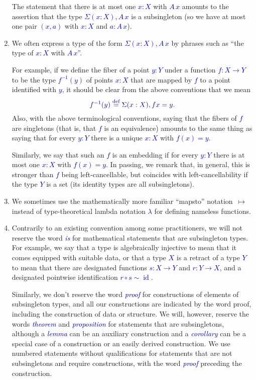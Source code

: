 \documentclass[10pt]{article}
\newcommand{\db}{\textcolor{darkblue}}
\newcommand{\df}[1]{\emph{\db{#1}}}
\newcommand{\m}[1]{\db{$#1$}}
\newcommand{\M}[1]{\[\db{#1}\]}
\newcommand{\id}{\operatorname{id}}
\newcommand{\comp}{\mathrel{\circ}}
\newcommand{\eqdef}{\overset{\text{def}}{=}}
\theoremstyle{definition}
\begin{document}
\begin{enumerate}
  The statement that there is at most one \m{x:X} with \m{A \, x}
  amounts to the assertion that the type \m{\Sigma (x:X), A \, x} is a
  subsingleton (so we have at most one pair \m{(x,a)} with \m{x:X} and
  \m{a : A\, x}).

\item We often express a type of the form \m{\Sigma(x:X), A \, x} by
  phrases such as ``the type of \m{x:X} with \m{A \, x}''.

  For example, if we define the fiber of a point \m{y:Y} under a
  function \m{f : X \to Y} to be the type \m{f^{-1}(y)} of points \m{x:X}
  that are mapped by \m{f} to a point identified with \m{y}, it
  should be clear from the above conventions that we mean
  \M{
   f^{-1}(y) \eqdef \Sigma (x : X), f x = y.
  }
 Also, with the above terminological conventions, saying that the
 fibers of \m{f} are singletons (that is, that \m{f} is an equivalence)
 amounts to the same thing as saying that for every \m{y:Y} there is a
 unique \m{x:X} with \m{f(x)=y}.

 Similarly, we say that such an \m{f} is an embedding if for every
 \m{y:Y} there is at most one \m{x:X} with \m{f(x)=y}. In passing, we
 remark that, in general, this is stronger than \m{f} being
 left-cancellable, but coincides with left-cancellability if the type
 \m{Y} is a set (its identity types are all subsingletons).

\item We sometimes use the mathematically more familiar ``mapsto''
  notation~\m{\mapsto} instead of type-theoretical lambda notation
  \m{\lambda} for defining nameless functions.

\item Contrarily to an existing convention among some practitioners,
  we will not reserve the word \df{is} for mathematical statements
  that are subsingleton types. For example, we say that a type is
  algebraically injective to mean that it comes equipped with suitable
  data, or that a type \m{X} is a retract of a type \m{Y} to mean that
  there are designated functions \m{s : X \to Y} and \m{r : Y \to X},
  and a designated pointwise identification \m{r \comp s \sim \id}.

  Similarly, we don't reserve the word \df{proof} for constructions of
  elements of subsingleton types, and all our constructions are
  indicated by the word proof, including the construction of data or
  structure.  We will, however, reserve the words \df{theorem} and
  \df{proposition} for statements that are subsingletons, although a
  \df{lemma} can be an auxiliary construction and a \df{corollary} can
  be a special case of a construction or an easily derived
  construction. We use numbered statements without qualifications for
  statements that are not subsingletons and require constructions,
  with the word \df{proof} preceding the construction.


\end{enumerate}
\end{document}
